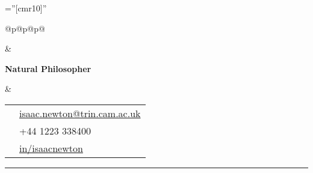\documentclass[letterpaper,12pt]{article}
\newcommand{\contactinfo}{%
    {\hlight\color{dark-gray}}
  }
\newcommand{\headline}{
    {\fontsize{14pt}{17pt}\bfseries\color{dark-gray}Natural Philosopher}
  }
\newcommand{\name}{
    \raggedright\fontsize{42pt}{42pt}\bfseries\flushleft\color{dark-gray}{Isaac Newton}
  }
\newcommand{\lighthrule}{
    {\color{light-gray}\par\rule[0mm]{\hsize}{0.5mm}\par\vspace{0.5em}}
  }
\newcommand\Mybox[1]{%
    \setlength\fboxsep{0pt}\fcolorbox{red}{white}{#1}
  }
\begin{document}
\nocite{}
\pagestyle{empty} %
\font\fb=''[cmr10]'' %
\newlength{\leftwide}
\setlength{\leftwide}{0.34\textwidth}
%
\newlength{\centerwide}
\setlength{\centerwide}{0.33\textwidth}
%
\newlength{\rightwide}
\setlength{\rightwide}{0.28\textwidth}
\begin{tabular}[b]{@{}p{\leftwide}@{}p{\centerwide}@{}p{\rightwide}@{}}
  \noindent
  \begin{minipage}[b]{\leftwide}
    \name
  \end{minipage} & %
  \begin{minipage}[b]{\centerwide}
    \parbox[b][][b]{4.5cm}{\raggedright\headline}
  \end{minipage} & %
  \begin{minipage}[b]{\rightwide}
    \renewcommand\arraystretch{1.25}
    \contactinfo
    \begin{tabular}[b]{@{}cl@{}}
      \faEnvelopeO & \href{mailto:isaac.newton@trin.cam.ac.uk}{isaac.newton@trin.cam.ac.uk}\\ %
      \faPhone & +44 1223 338400\\
      \faLinkedin & \href{http://www.linkedin.com/in/isaacnewton}{in/isaacnewton}
    \end{tabular}
  \end{minipage}
\end{tabular}
\lighthrule
\end{document}
